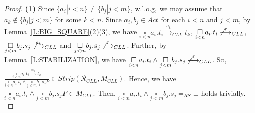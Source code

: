 \documentclass{elsarticle}
\theoremstyle{plain}
\theoremstyle{definition}
\begin{document}
\begin{proof}
  \noindent \textbf{(1)} Since $\{a_i|i< n\}\neq \{b_j|j< m\}$, w.l.o.g, we may assume that $a_k \notin \{b_j|j< m\}$ for some $k< n$.
  Since $a_i,b_j\in Act$ for each $i< n$ and $j< m$, by Lemma~\ref{L:BIG_SQUARE}(2)(3), we have $\underset{i< n}{\square}a_i.t_i \stackrel{a_k}{\longrightarrow}_{{CLL}} t_k $, $\underset{i< n}{\square}a_i.t_i \not\stackrel{\tau}{\longrightarrow}_{{CLL}}$, $\underset{j< m}{\square}b_j.s_j \not\stackrel{a_k}{\longrightarrow}_{{CLL}}$ and $\underset{j< m}{\square}b_j.s_j \not\stackrel{\tau}{\longrightarrow}_{{CLL}}$.
  Further, by Lemma~\ref{L:STABILIZATION}, we have $\underset{i< n} {\square}a_i.t_i \wedge \underset{j< m}{\square}b_j.s_j \not\stackrel{\tau}{\longrightarrow}_{{CLL}}$.
    So, $\frac{\underset{i< n}{\square}a_i.t_i \stackrel{a_k}{\longrightarrow} t_k }{\underset{i< n}{\square}a_i.t_i \wedge \underset{j< m}{\square}b_j.s_jF }\in Strip({\mathcal R}_{CLL},M_{{CLL}})$.
    Hence,  we have $\underset{i< n}{\square}a_i.t_i \wedge \underset{j< m}{\square}b_j.s_jF \in M_{{CLL}}$.
Then, $\underset{i< n}{\square}a_i.t_i \wedge \underset{j< m}{\square}b_j.s_j =_{RS} \bot$ holds trivially.\\


\end{proof}
\end{document}
